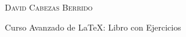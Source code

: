 \thispagestyle{empty}
\begin{center}
    \scshape
    \lsstyle
    David Cabezas Berrido
    
    Curso Avanzado de \LaTeX: Libro con Ejercicios
\end{center}
